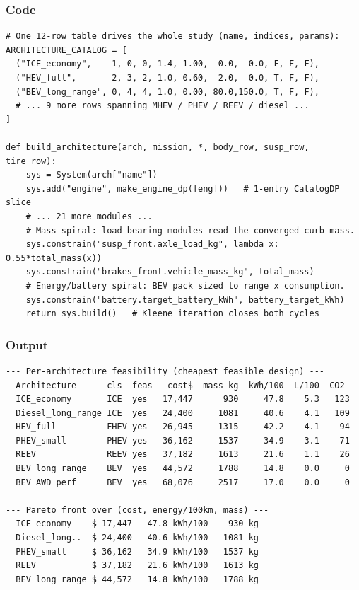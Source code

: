 \documentclass[11pt,a4paper]{article}
\begin{document}
\subsubsection*{Code}
\begin{lstlisting}
# One 12-row table drives the whole study (name, indices, params):
ARCHITECTURE_CATALOG = [
  ("ICE_economy",    1, 0, 0, 1.4, 1.00,  0.0,  0.0, F, F, F),
  ("HEV_full",       2, 3, 2, 1.0, 0.60,  2.0,  0.0, T, F, F),
  ("BEV_long_range", 0, 4, 4, 1.0, 0.00, 80.0,150.0, T, F, F),
  # ... 9 more rows spanning MHEV / PHEV / REEV / diesel ...
]

def build_architecture(arch, mission, *, body_row, susp_row, tire_row):
    sys = System(arch["name"])
    sys.add("engine", make_engine_dp([eng]))   # 1-entry CatalogDP slice
    # ... 21 more modules ...
    # Mass spiral: load-bearing modules read the converged curb mass.
    sys.constrain("susp_front.axle_load_kg", lambda x: 0.55*total_mass(x))
    sys.constrain("brakes_front.vehicle_mass_kg", total_mass)
    # Energy/battery spiral: BEV pack sized to range x consumption.
    sys.constrain("battery.target_battery_kWh", battery_target_kWh)
    return sys.build()   # Kleene iteration closes both cycles
\end{lstlisting}

\subsubsection*{Output}
\begin{lstlisting}[language={},numbers=none,keywordstyle={}]
--- Per-architecture feasibility (cheapest feasible design) ---
  Architecture      cls  feas   cost$  mass kg  kWh/100  L/100  CO2
  ICE_economy       ICE  yes   17,447      930     47.8    5.3   123
  Diesel_long_range ICE  yes   24,400     1081     40.6    4.1   109
  HEV_full          FHEV yes   26,945     1315     42.2    4.1    94
  PHEV_small        PHEV yes   36,162     1537     34.9    3.1    71
  REEV              REEV yes   37,182     1613     21.6    1.1    26
  BEV_long_range    BEV  yes   44,572     1788     14.8    0.0     0
  BEV_AWD_perf      BEV  yes   68,076     2517     17.0    0.0     0

--- Pareto front over (cost, energy/100km, mass) ---
  ICE_economy    $ 17,447   47.8 kWh/100    930 kg
  Diesel_long..  $ 24,400   40.6 kWh/100   1081 kg
  PHEV_small     $ 36,162   34.9 kWh/100   1537 kg
  REEV           $ 37,182   21.6 kWh/100   1613 kg
  BEV_long_range $ 44,572   14.8 kWh/100   1788 kg
\end{lstlisting}
\end{document}
